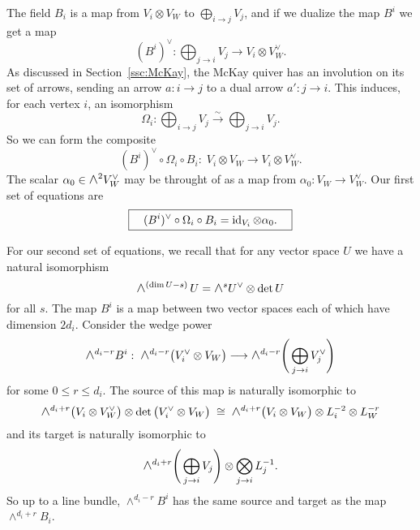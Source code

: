 \documentclass{amsart}
\theoremstyle{definition}
\newtheorem{notn}[theorem]{Notation}
\newcommand{\Wedge}{\mbox{\scalebox{1.2}{$\wedge$}}}
\newcommand\isoto{\stackrel{\sim}{\longrightarrow}}
\newcommand\VW{V_W}
\newcommand\W{W}
\begin{document}
The field $B_i$ is a map from $V_i\otimes \VW$ to $\bigoplus_{i\to j} V_j$, and if we dualize the map $B^i$ we get a map
$$(B^i)^\vee: \bigoplus_{j \to i} V_j \longrightarrow V_i\otimes \VW^\vee.$$
As discussed in Section~\ref{ssc:McKay}, the McKay quiver has an involution on its set of arrows, sending an arrow $a:i\to j$ to a dual arrow $a':j\to i$.
This induces, for each vertex $i$, an isomorphism
$$ \Omega_i: \bigoplus_{i\to j} V_j \isoto \bigoplus_{j\to i} V_j. $$
So we can form the composite 
$$(B^i)^\vee\circ\Omega_i\circ B_i :\; V_i \otimes \VW \longrightarrow V_i\otimes \VW^\vee.$$
The scalar $\alpha_0\in \Wedge^2 \VW^\vee$ may be throught of as a map from $\alpha_0 \colon \VW \rightarrow \VW^\vee$. Our first set of equations are
\begin{equation}\label{eq:rel1}
\boxed{\quad (B^i)^\vee\circ\Omega_i\circ B_i  = \operatorname{id}_{V_i} \otimes \alpha_0. \quad}
\end{equation}



For our second set of equations, we recall that for any vector space $U$ we have a natural isomorphism 
$$\Wedge^{(\dim U -s)}\, U = \Wedge^s U^\vee \otimes \det U $$
for all $s$.  The map $B^i$ is a map between two vector spaces each of which have dimension $2d_i$. Consider the wedge power
$$\Wedge^{d_i-r} B^i: \; \Wedge^{d_i-r}\big( V_i^\vee\otimes \VW \big) \longrightarrow \Wedge^{d_i-r} \Bigg( \bigoplus_{j\to i} V_j^\vee \Bigg) $$
for some $0\leq r \leq d_i$. The source of this map is naturally isomorphic to
$$ \Wedge^{d_i+r} \big( V_i \otimes \VW^\vee \big) \otimes \det \big( V_i^\vee\otimes \VW \big) \; \cong\; 
  \Wedge^{d_i+r} \big( V_i \otimes \VW \big) \otimes L_i^{-2}\otimes L_W^{-r} $$
and its target is naturally isomorphic to
$$\Wedge^{d_i+r} \Bigg( \bigoplus_{j\to i} V_j \Bigg)\otimes \bigotimes_{j\to i} L_j^{-1}. $$
So up to a line bundle, $\wedge^{d_i-r} B^i$ has the same source and target as the map $\wedge^{d_i+r} B_i$. 
\end{document}
